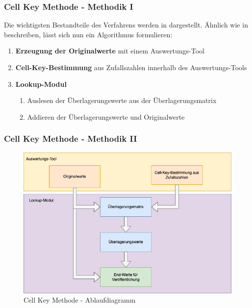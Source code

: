 \documentclass[aspectratio=169]{beamer}
\begin{document}
\begin{frame}{}
	\frametitle{Cell Key Methode - Methodik I}
    Die wichtigsten Bestandteile des Verfahrens werden in \cite{Enderle} dargestellt. Ähnlich wie in \cite{Wipke} beschreiben, lässt sich nun ein Algorithmus formulieren: 
    \newline
    \begin{enumerate}
        \item \textbf{Erzeugung der Originalwerte} mit einem Auswertungs-Tool
        \item \textbf{Cell-Key-Bestimmung} aus Zufallszahlen innerhalb des Auswertungs-Tools
        \item \textbf{Lookup-Modul}
        \begin{enumerate}
            \item Auslesen der Überlagerungswerte aus der Überlagerungsmatrix
            \item Addieren der Überlagerungswerte und Originalwerte
        \end{enumerate}
    \end{enumerate}
\end{frame}


\begin{frame}{}
	\frametitle{Cell Key Methode - Methodik II}
    \begin{figure}
		\centering
		\includegraphics[width=0.59\linewidth]{img/ckm_flow.png}
		\caption{Cell Key Methode - Ablaufdiagramm}
		\label{fig:ckm_flow}
	\end{figure} 
\end{frame}
\end{document}
